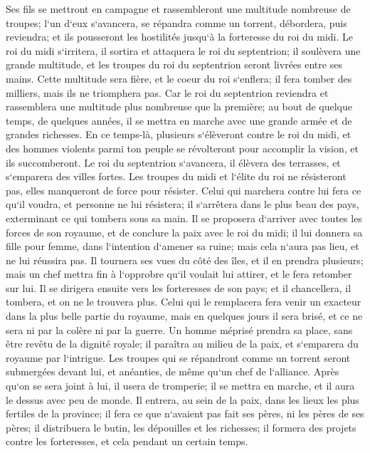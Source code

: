 \verse Ses fils se mettront en campagne et rassembleront une multitude nombreuse de troupes; l`un d`eux s`avancera, se répandra comme un torrent, débordera, puis reviendra; et ils pousseront les hostilités jusqu`à la forteresse du roi du midi. 
\verse Le roi du midi s`irritera, il sortira et attaquera le roi du septentrion; il soulèvera une grande multitude, et les troupes du roi du septentrion seront livrées entre ses mains. 
\verse Cette multitude sera fière, et le coeur du roi s`enflera; il fera tomber des milliers, mais ils ne triomphera pas. 
\verse Car le roi du septentrion reviendra et rassemblera une multitude plus nombreuse que la première; au bout de quelque temps, de quelques années, il se mettra en marche avec une grande armée et de grandes richesses. 
\verse En ce temps-là, plusieurs s`élèveront contre le roi du midi, et des hommes violents parmi ton peuple se révolteront pour accomplir la vision, et ils succomberont. 
\verse Le roi du septentrion s`avancera, il élèvera des terrasses, et s`emparera des villes fortes. Les troupes du midi et l`élite du roi ne résisteront pas, elles manqueront de force pour résister. 
\verse Celui qui marchera contre lui fera ce qu`il voudra, et personne ne lui résistera; il s`arrêtera dans le plus beau des pays, exterminant ce qui tombera sous sa main. 
\verse Il se proposera d`arriver avec toutes les forces de son royaume, et de conclure la paix avec le roi du midi; il lui donnera sa fille pour femme, dans l`intention d`amener sa ruine; mais cela n`aura pas lieu, et ne lui réussira pas. 
\verse Il tournera ses vues du côté des îles, et il en prendra plusieurs; mais un chef mettra fin à l`opprobre qu`il voulait lui attirer, et le fera retomber sur lui. 
\verse Il se dirigera ensuite vers les forteresses de son pays; et il chancellera, il tombera, et on ne le trouvera plus. 
\verse Celui qui le remplacera fera venir un exacteur dans la plus belle partie du royaume, mais en quelques jours il sera brisé, et ce ne sera ni par la colère ni par la guerre. 
\verse Un homme méprisé prendra sa place, sans être revêtu de la dignité royale; il paraîtra au milieu de la paix, et s`emparera du royaume par l`intrigue. 
\verse Les troupes qui se répandront comme un torrent seront submergées devant lui, et anéanties, de même qu`un chef de l`alliance. 
\verse Après qu`on se sera joint à lui, il usera de tromperie; il se mettra en marche, et il aura le dessus avec peu de monde. 
\verse Il entrera, au sein de la paix, dans les lieux les plus fertiles de la province; il fera ce que n`avaient pas fait ses pères, ni les pères de ses pères; il distribuera le butin, les dépouilles et les richesses; il formera des projets contre les forteresses, et cela pendant un certain temps. 
